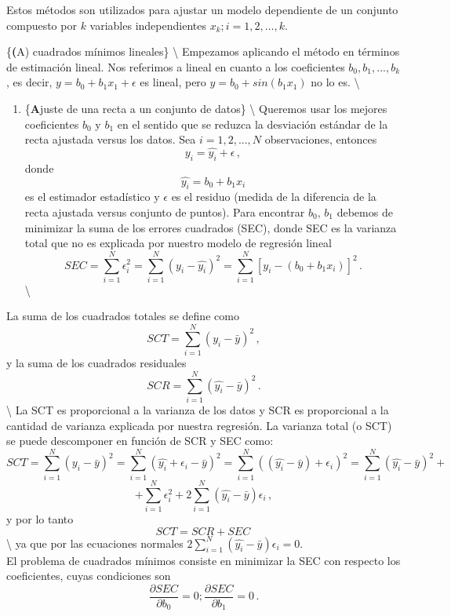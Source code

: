 \documentclass[
]{agujournal2019}
\providecommand{\tightlist}{%
  \setlength{\itemsep}{0pt}\setlength{\parskip}{0pt}}\usepackage{longtable,booktabs,array}
\begin{document}
\noindent Estos métodos son utilizados para ajustar un modelo
dependiente de un conjunto compuesto por \(k\) variables independientes
\(x_k;i=1,2,...,k\).

\vspace{0.5cm}

\{\noindent \textbf (A) \large cuadrados mínimos lineales\}
\textbackslash{} Empezamos aplicando el método en términos de estimación
lineal. Nos referimos a lineal en cuanto a los coeficientes
\(b_0, b_1,...,b_k\), es decir, \(y=b_0 + b_1x_1 + \epsilon\) es lineal,
pero \(y=b_0+sin(b_1x_1)\) no lo es. \textbackslash{}

\begin{enumerate}
\def\labelenumi{(\arabic{enumi})}
\tightlist
\item
  \{\textbf Ajuste de una recta a un conjunto de datos\}
  \textbackslash{} \noindent Queremos usar los mejores coeficientes
  \(b_0\) y \(b_1\) en el sentido que se reduzca la desviación estándar
  de la recta ajustada versus los datos. Sea \(i=1,2,...,N\)
  observaciones, entonces \[y_i=\hat{y_i} + \epsilon\,,\] donde
  \[\hat{y_i}=b_0+b_1 x_i\] es el estimador estadístico y \(\epsilon\)
  es el residuo (medida de la diferencia de la recta ajustada versus
  conjunto de puntos). Para encontrar \(b_0, \, b_1\) debemos de
  minimizar la suma de los errores cuadrados (SEC), donde SEC es la
  varianza total que no es explicada por nuestro modelo de regresión
  lineal
  \[SEC=\sum^N_{i=1} \epsilon^2_i=\sum^N_{i=1} (y_i - \hat{y_i})^2=\sum^N_{i=1} [y_i - (b_0+b_1 x_i)]^2\,.\]
  \textbackslash{}
\end{enumerate}

La suma de los cuadrados totales se define como
\[SCT=\sum^N_{i=1} (y_i - \bar{y})^2\,,\] y la suma de los cuadrados
residuales \[SCR=\sum^N_{i=1} (\hat{y_i} - \bar{y})^2\,.\]
\textbackslash{} La SCT es proporcional a la varianza de los datos y SCR
es proporcional a la cantidad de varianza explicada por nuestra
regresión. La varianza total (o SCT) se puede descomponer en función de
SCR y SEC como:
\[SCT=\sum^N_{i=1}(y_i-\bar{y})^2 = \sum^N_{i=1}(\hat{y_i} + \epsilon_i - \bar{y})^2
=\sum^N_{i=1}((\hat{y_i}- \bar{y}) + \epsilon_i)^2=\sum^N_{i=1}(\hat{y_i}- \bar{y})^2 +\]
\[+\sum^N_{i=1}\epsilon_i^2 + 2\sum^N_{i=1}(\hat{y_i}- \bar{y})\epsilon_i\,,\]
y por lo tanto \[SCT=SCR + SEC\,\] \textbackslash{} ya que por las
ecuaciones normales \(2\sum^N_{i=1}(\hat{y_i}- \bar{y})\epsilon_i=0\).\\

\noindent El problema de cuadrados mínimos consiste en minimizar la SEC
con respecto los coeficientes, cuyas condiciones son
\[\frac{\partial{SEC}}{\partial{b_0}}=0; \frac{\partial{SEC}}{\partial{b_1}}=0\,.\]\\
\end{document}
